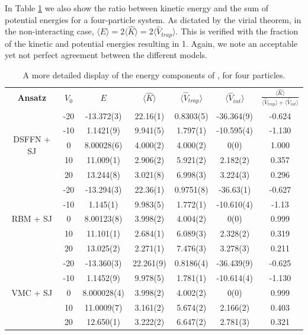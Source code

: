 In Table \ref{tab:energy_components1d} we also show the ratio between kinetic energy and the sum of potential energies for a four-particle system. As dictated by the virial theorem, in the non-interacting case, $\langle E\rangle = 2\langle \hat{K}\rangle = 2\langle \hat{V}_{trap}\rangle$. This is verified with the fraction of the kinetic and potential energies resulting in 1. Again, we note an acceptable yet not perfect agreement between the different models.

\begin{table}[H]
    \centering
\begin{tabular}{c|c|c|c|c|c|c}
\toprule
\multirow{2}{*}{\textbf{Ansatz}} & \multirow{2}{*}{$V_0$} & \multirow{2}{*}{$E$} & \multirow{2}{*}{$\langle \hat{K}\rangle$} & \multirow{2}{*}{$\langle \hat{V}_{trap}\rangle$} & \multirow{2}{*}{$\langle \hat{V}_{int}\rangle$} & \multirow{2}{*}{$\frac{\langle \hat{K} \rangle}{\langle \hat{V}_{trap} \rangle + \langle \hat{V}_{int} \rangle}$} \\
 & & & & & & \\
\midrule
\multirow{5}{*}{DSFFN + SJ}& -20& -13.372(3) & 22.16(1) & 0.8303(5) & -36.364(9) & -0.624
\\
 & -10& 1.1421(9) & 9.941(5) & 1.797(1) & -10.595(4) & -1.130 \\
 & 0& 8.00028(6) & 4.000(2) & 4.000(2) & 0(0) & 1.000 \\
 & 10& 11.009(1) & 2.906(2) & 5.921(2) & 2.182(2) & 0.357 \\
 & 20& 13.244(8) & 3.021(8) & 6.998(3) & 3.224(3) & 0.296 \\
\midrule
\multirow{5}{*}{RBM + SJ} & -20& -13.294(3) & 22.36(1) & 0.9751(8) & -36.63(1) & -0.627 \\
 & -10& 1.145(1) & 9.983(5) & 1.772(1) & -10.610(4) & -1.13 \\
 & 0& 8.00123(8) & 3.998(2) & 4.004(2) & 0(0) & 0.999 \\
 & 10& 11.101(1) & 2.684(1) & 6.089(3) & 2.328(2) & 0.319 \\
 & 20& 13.025(2) & 2.271(1) & 7.476(3) & 3.278(3) & 0.211 \\
\midrule
\multirow{5}{*}{VMC + SJ}& -20 & -13.360(3) & 22.261(9) & 0.8186(4) & -36.439(9) & -0.625 \\
 & -10& 1.1452(9) & 9.978(5) & 1.781(1) & -10.614(4) & -1.130 \\
 & 0& 8.000028(4) & 3.998(2) & 4.002(2) & 0(0) & 0.999 \\
 & 10& 11.0009(7) & 3.161(2) & 5.674(2) & 2.166(2) & 0.403 \\
 & 20& 12.650(1) & 3.222(2) & 6.647(2) & 2.781(3) & 0.321 \\
\bottomrule
\end{tabular}
\caption{A more detailed display of the energy components of , for four particles.}
\label{tab:energy_components1d}
\end{table}


